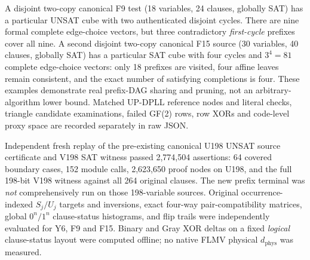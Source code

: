 \documentclass[11pt]{article}
\begin{document}
A disjoint two-copy canonical F9 test (18 variables, 24 clauses, globally SAT) has a particular UNSAT cube with two authenticated disjoint cycles. There are nine formal complete edge-choice vectors, but three contradictory \emph{first-cycle} prefixes cover all nine. A second disjoint two-copy canonical F15 source (30 variables, 40 clauses, globally SAT) has a particular SAT cube with four cycles and $3^4=81$ complete edge-choice vectors: only 18 prefixes are visited, four affine leaves remain consistent, and the exact number of satisfying completions is four. These examples demonstrate real prefix-DAG sharing and pruning, not an arbitrary-algorithm lower bound. Matched UP-DPLL reference nodes and literal checks, triangle candidate examinations, failed GF(2) rows, row XORs and code-level proxy space are recorded separately in raw JSON.

Independent fresh replay of the pre-existing canonical U198 UNSAT source certificate and V198 SAT witness passed 2,774,504 assertions: 64 covered boundary cases, 152 module calls, 2,623,650 proof nodes on U198, and the full 198-bit V198 witness against all 264 original clauses. The new prefix terminal was \emph{not} comprehensively run on those 198-variable sources. Original occurrence-indexed $S_j/U_j$ targets and inversions, exact four-way pair-compatibility matrices, global $0^n/1^n$ clause-status histograms, and flip trails were independently evaluated for Y6, F9 and F15. Binary and Gray XOR deltas on a fixed \emph{logical} clause-status layout were computed offline; no native FLMV physical $d_{\mathrm{phys}}$ was measured.
\end{document}

